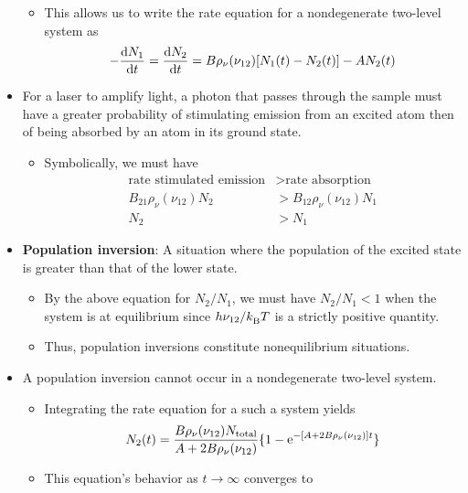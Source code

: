 \documentclass[../notes.tex]{subfiles}
\begin{document}
\begin{itemize}
\begin{itemize}
\begin{equation*}
        \end{equation*}
        \item This allows us to write the rate equation for a nondegenerate two-level system as
        \begin{equation*}
            -\dv{N_1}{t} = \dv{N_2}{t} = B\rho_\nu(\nu_{12})[N_1(t)-N_2(t)]-AN_2(t)
        \end{equation*}
    \end{itemize}
    \item For a laser to amplify light, a photon that passes through the sample must have a greater probability of stimulating emission from an excited atom then of being absorbed by an atom in its ground state.
    \begin{itemize}
        \item Symbolically, we must have
        \begin{align*}
            \text{rate stimulated emission} &> \text{rate absorption}\\
            B_{21}\rho_\nu(\nu_{12})N_2 &> B_{12}\rho_\nu(\nu_{12})N_1\\
            N_2 &> N_1
        \end{align*}
    \end{itemize}
    \item \textbf{Population inversion}: A situation where the population of the excited state is greater than that of the lower state.
    \begin{itemize}
        \item By the above equation for $N_2/N_1$, we must have $N_2/N_1<1$ when the system is at equilibrium since $h\nu_{12}/\kB T$ is a strictly positive quantity.
        \item Thus, population inversions constitute nonequilibrium situations.
    \end{itemize}
    \item A population inversion cannot occur in a nondegenerate two-level system.
    \begin{itemize}
        \item Integrating the rate equation for a such a system yields
        \begin{equation*}
            N_2(t) = \frac{B\rho_\nu(\nu_{12})N_\text{total}}{A+2B\rho_\nu(\nu_{12})}\{1-\e[-[{A+2B\rho_\nu(\nu_{12})]t}]\}
        \end{equation*}
        \item This equation's behavior as $t\to\infty$ converges to
        \begin{equation*}

\end{equation*}
\end{itemize}
\end{itemize}
\end{document}
